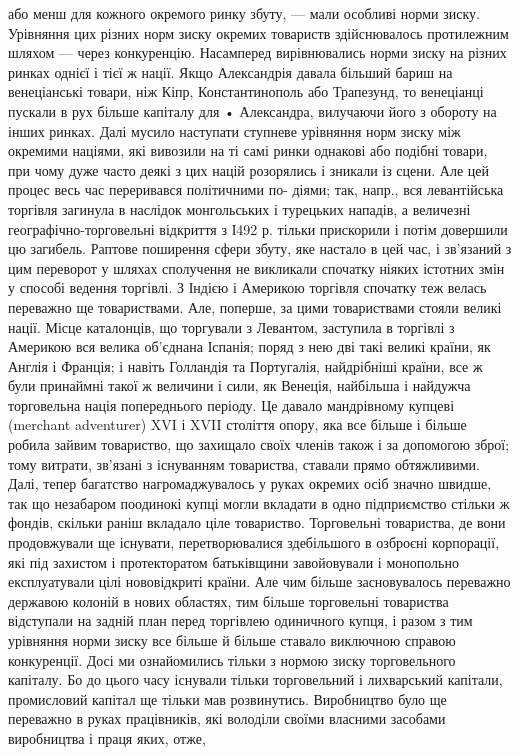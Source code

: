 \parcont{}  %
або менш для кожного окремого ринку збуту, — мали особливі норми зиску. Урівняння цих різних норм зиску окремих товариств здійснювалось протилежним шляхом — через конкуренцію. Насамперед вирівнювались норми зиску на різних ринках однієї і тієї ж
нації. Якщо Александрія давала більший бариш на венеціанські товари, ніж Кіпр, Константинополь або Трапезунд, то венеціанці
пускали в рух більше капіталу для • Александра, вилучаючи його з обороту на інших ринках. Далі мусило наступати ступневе
урівняння норм зиску між окремими націями, які вивозили на ті самі ринки однакові або подібні товари, при чому дуже часто
деякі з цих націй розорялись і зникали із сцени. Але цей процес весь час переривався політичними по- діями; так, напр., вся
левантійська торгівля загинула в наслідок монгольських і турецьких нападів, а величезні географічно-торговельні відкриття з
І492 р. тільки прискорили і потім довершили цю загибель. Раптове поширення сфери збуту, яке настало в цей час, і зв’язаний з
цим переворот у шляхах сполучення не викликали спочатку ніяких істотних змін у способі ведення торгівлі. З Індією і Америкою
торгівля спочатку теж велась переважно ще товариствами. Але, поперше, за цими товариствами стояли великі нації. Місце
каталонців, що торгували з Левантом, заступила в торгівлі з Америкою вся велика об’єднана Іспанія; поряд з нею дві такі
великі країни, як Англія і Франція; і навіть Голландія та Португалія, найдрібніші країни, все ж були принаймні такої ж
величини і сили, як Венеція, найбільша і найдужча торговельна нація попереднього періоду. Це давало мандрівному купцеві (merchant adventurer) XVI і XVII століття опору, яка все більше і більше робила зайвим товариство, що захищало своїх членів
також і за допомогою зброї; тому витрати, зв’язані з існуванням товариства, ставали прямо обтяжливими. Далі, тепер багатство
нагромаджувалось у руках окремих осіб значно швидше, так що незабаром поодинокі купці могли вкладати в одно підприємство
стільки ж фондів, скільки раніш вкладало ціле товариство. Торговельні товариства, де вони продовжували ще існувати,
перетворювалися здебільшого в озброєні корпорації, які під захистом і протекторатом батьківщини завойовували і монопольно
експлуатували цілі нововідкриті країни. Але чим більше засновувалось переважно державою колоній в нових областях, тим більше
торговельні товариства відступали на задній план перед торгівлею одиничного купця, і разом з тим урівняння норми зиску все
більше й більше ставало виключною справою конкуренції. Досі ми ознайомились тільки з нормою зиску торговельного капіталу. Бо
до цього часу існували тільки торговельний і лихварський капітали, промисловий капітал ще тільки мав розвинутись.
Виробництво було ще переважно в руках працівників, які володіли своїми власними засобами виробництва і праця яких, отже,
\parbreak{}  %
